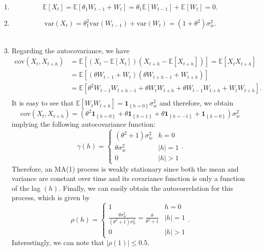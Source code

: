 \documentclass[]{book}
\providecommand{\tightlist}{%
  \setlength{\itemsep}{0pt}\setlength{\parskip}{0pt}}
\theoremstyle{definition}
\theoremstyle{definition}
\theoremstyle{definition}
\theoremstyle{remark}
\begin{document}
\begin{enumerate}
\def\labelenumi{\arabic{enumi}.}
\tightlist
\item
  \[ 
  \mathbb{E}\left[ {{X_t}} \right] = \mathbb{E}\left[ {{\theta_1}{W_{t - 1}} + {W_t}} \right] 
  = {\theta_1} \mathbb{E} \left[ {{W_{t - 1}}} \right] + \mathbb{E}\left[ {{W_t}} \right] 
  = 0. \]
\item
  \[\text{var} \left( {{X_t}} \right) = \theta_1^2 \text{var} \left( W_{t - 1}\right) + \text{var} \left( W_{t}\right) = \left(1 + \theta^2 \right) \sigma^2_w.\]\\
\item
  Regarding the autocovariance, we have \[\begin{aligned}
     \text{cov}\left( {{X_t},{X_{t + h}}} \right) &= \mathbb{E}\left[ {\left( {{X_t} - \mathbb{E}\left[ {{X_t}} \right]} \right)\left( {{X_{t + h}} - \mathbb{E}\left[ {{X_{t + h}}} \right]} \right)} \right] = \mathbb{E}\left[ {{X_t}{X_{t + h}}} \right] \\
     &= \mathbb{E}\left[ {\left( {{\theta}{W_{t - 1}} + {W_t}} \right)\left( {{\theta }{W_{t + h - 1}} + {W_{t + h}}} \right)} \right] \\
     &= \mathbb{E}\left[ {\theta^2{W_{t - 1}}{W_{t + h - 1}} + \theta {W_t}{W_{t + h}} + {\theta}{W_{t - 1}}{W_{t + h}} + {W_t}{W_{t + h}}} \right]. \\
     \end{aligned} \] It is easy to see that
  \(\mathbb{E}\left[ {{W_t}{W_{t + h}}} \right] = {\boldsymbol{1}_{\left\{ {h = 0} \right\}}}\sigma _w^2\)
  and therefore, we obtain
  \[\text{cov} \left( {{X_t},{X_{t + h}}} \right) = \left( {\theta^2{ \boldsymbol{1}_{\left\{ {h = 0} \right\}}} + {\theta}{\boldsymbol{1}_{\left\{ {h = 1} \right\}}} + {\theta}{\boldsymbol{1}_{\left\{ {h =  - 1} \right\}}} + {\boldsymbol{1}_{\left\{ {h = 0} \right\}}}} \right)\sigma _w^2\]
  implying the following autocovariance function:
  \[\gamma \left( h \right) = \left\{ {\begin{array}{*{20}{c}}
  {\left( {\theta^2 + 1} \right)\sigma _w^2}&{h = 0} \\ 
  {{\theta}\sigma _w^2}&{\left| h \right| = 1} \\ 
  0&{\left| h \right| > 1} 
  \end{array}} \right. .\] Therefore, an MA(1) process is weakly
  stationary since both the mean and variance are constant over time and
  its covariance function is only a function of the lag \((h)\).
  Finally, we can easily obtain the autocorrelation for this process,
  which is given by
  \[\rho \left( h \right) = \left\{ {\begin{array}{*{20}{c}}
    1&{h = 0} \\ 
    {\frac{{{\theta}\sigma _w^2}}{{\left( {\theta^2 + 1} \right)\sigma _w^2}} = \frac{{{\theta}}}{{\theta^2 + 1}}}&{\left| h \right| = 1} \\ 
    0&{\left| h \right| > 1} 
    \end{array}} \right. .\] Interestingly, we can note that
  \(|\rho(1)| \leq 0.5\).

\end{enumerate}
\end{document}
